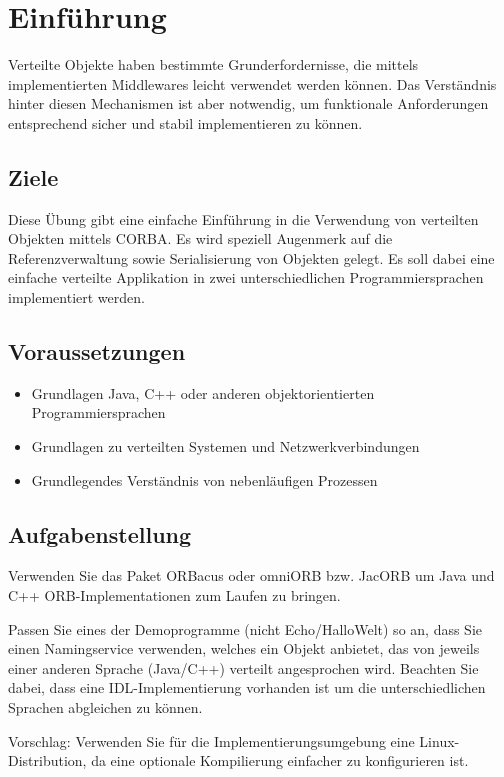 
\section{Einführung}
Verteilte Objekte haben bestimmte Grunderfordernisse, die mittels implementierten Middlewares leicht verwendet werden können. Das Verständnis hinter diesen Mechanismen ist aber notwendig, um funktionale Anforderungen entsprechend sicher und stabil implementieren zu können.

\subsection{Ziele}
Diese Übung gibt eine einfache Einführung in die Verwendung von verteilten Objekten mittels CORBA. Es wird speziell Augenmerk auf die Referenzverwaltung sowie Serialisierung von Objekten gelegt. Es soll dabei eine einfache verteilte Applikation in zwei unterschiedlichen Programmiersprachen implementiert werden.

\subsection{Voraussetzungen}
\begin{itemize}
	\item Grundlagen Java, C++ oder anderen objektorientierten Programmiersprachen
	\item Grundlagen zu verteilten Systemen und Netzwerkverbindungen
	\item Grundlegendes Verständnis von nebenläufigen Prozessen
\end{itemize}

\subsection{Aufgabenstellung}
Verwenden Sie das Paket ORBacus oder omniORB bzw. JacORB um Java und C++ \linebreak ORB-Implementationen zum Laufen zu bringen.

Passen Sie eines der Demoprogramme (nicht Echo/HalloWelt) so an, dass Sie einen Namingservice verwenden, welches ein Objekt anbietet, das von jeweils einer anderen Sprache (Java/C++) verteilt angesprochen wird. Beachten Sie dabei, dass eine IDL-Implementierung vorhanden ist um die unterschiedlichen Sprachen abgleichen zu können.

Vorschlag: Verwenden Sie für die Implementierungsumgebung eine Linux-Distribution, da eine optionale Kompilierung einfacher zu konfigurieren ist.
\clearpage
